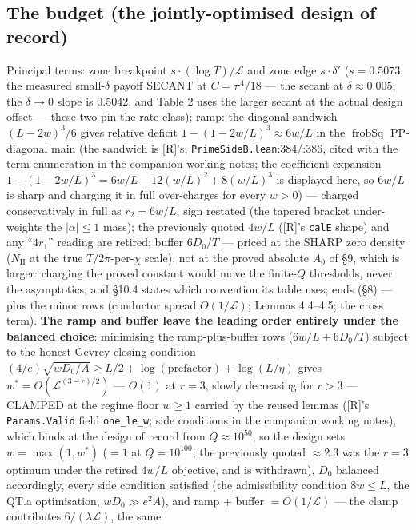 \documentclass[11pt]{amsart}
\DeclareMathOperator{\frobSq}{frobSq}
\theoremstyle{plain}
\theoremstyle{remark}
\begin{document}
\subsection{The budget (the jointly-optimised design of record)}
Principal terms: zone breakpoint $s\cdot(\log T)/\mathcal{L}$ and zone edge
$s\cdot\delta'$ ($s = 0.5073$, the measured small-$\delta$ payoff SECANT at
$C = \pi^4/18$ --- the secant at $\delta \approx 0.005$; the $\delta \to 0$ slope is
0.5042, and Table 2 uses the larger secant at the actual design offset --- these two
pin the rate class); ramp: the diagonal sandwich $(L-2w)^3/6$ gives relative deficit
$1 - (1 - 2w/L)^3 \approx 6w/L$ in the $\frobSq$ PP-diagonal main (the sandwich is
[R]'s, \texttt{PrimeSideB.lean}:384/:386, cited with the term enumeration in the
companion working notes; the coefficient expansion
$1 - (1 - 2w/L)^3 = 6w/L - 12(w/L)^2 + 8(w/L)^3$ is displayed here, so $6w/L$ is
sharp and charging it in full over-charges for every $w > 0$) --- charged
conservatively in full as $r_2 = 6w/L$, sign restated (the tapered bracket
under-weights the $|\alpha| \le 1$ mass); the previously quoted $4w/L$ ([R]'s
\texttt{calE} shape) and any ``$4r_1$'' reading are retired; buffer $6D_0/T$ ---
priced at the SHARP zero density ($N_{\mathrm{II}}$ at the true $T/2\pi$-per-$\chi$
scale), not at the proved absolute $A_0$ of \S9, which is larger: charging the proved
constant would move the finite-$Q$ thresholds, never the asymptotics, and \S10.4
states which convention its table uses; ends (\S8) --- plus the minor rows (conductor
spread $O(1/\mathcal{L})$; Lemmas 4.4--4.5; the cross term). \textbf{The ramp and
buffer leave the leading order entirely under the balanced choice}: minimising the
ramp-plus-buffer rows ($6w/L + 6D_0/T$) subject to the honest Gevrey closing
condition $(4/e)\sqrt{wD_0/A} \ge L/2 + \log(\text{prefactor}) + \log(L/\eta)$ gives
$w^* = \Theta(\mathcal{L}^{(3-r)/2})$ --- $\Theta(1)$ at $r = 3$, slowly decreasing
for $r > 3$ --- CLAMPED at the regime floor $w \ge 1$ carried by the reused lemmas
([R]'s \texttt{Params.Valid} field \texttt{one\_le\_w}; side conditions in the
companion working notes), which binds at the design of record from
$Q \approx 10^{50}$; so the design sets $w = \max(1, w^*)$ ($= 1$ at $Q = 10^{100}$;
the previously quoted $\approx 2.3$ was the $r = 3$ optimum under the retired $4w/L$
objective, and is withdrawn), $D_0$ balanced accordingly, every side condition
satisfied (the admissibility condition $8w \le L$, the QT.a optimisation, $wD_0 \gg e^2A$), and ramp + buffer
$= O(1/\mathcal{L})$ --- the clamp contributes $6/(\lambda\mathcal{L})$, the same
\end{document}
